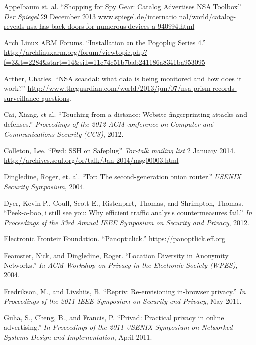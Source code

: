 \documentclass[conference]{IEEEtran}
\begin{document}
\begin{thebibliography}{1}

 Appelbaum et. al. ``Shopping for Spy Gear: Catalog Advertises 
NSA Toolbox'' \emph{Der Spiegel} 29 December 2013 \url{www.spiegel.de/internatio
nal/world/catalog-reveals-nsa-has-back-doors-for-numerous-devices-a-940994.html}

 Arch Linux ARM Forums. ``Installation on the Pogoplug Series 4.'' \url{http://archlinuxarm.org/forum/viewtopic.php?f=3&t=2284&start=14&sid=11c74c51b7bab241186a8341ba953095}

 Arther, Charles.  ``NSA scandal: what data is being monitored and how does it work?'' \url{http://www.theguardian.com/world/2013/jun/07/nsa-prism-records-surveillance-questions}.

 Cai, Xiang, et al. ``Touching from a distance: Website fingerprinting attacks and defenses.'' \emph{Proceedings of the 2012 ACM conference on Computer and Communications Security (CCS)}, 2012.

 Colleton, Lee. ``Fwd: SSH on Safeplug'' \emph{Tor-talk mailing list} 2 January 2014. \url{http://archives.seul.org/or/talk/Jan-2014/msg00003.html}

 Dingledine, Roger, et. al. ``Tor: The second-generation onion router.'' \emph{USENIX Security Symposium}, 2004.

 Dyer, Kevin P., Coull, Scott E., Ristenpart, Thomas, and Shrimpton, Thomas.  ``Peek-a-boo, i still see you: Why efficient traffic analysis countermeasures fail.'' \emph{In Proceedings of the 33rd Annual IEEE Symposium on Security and Privacy}, 2012.

 Electronic Fronteir Foundation. ``Panopticlick.'' \url{https://panoptlick.eff.org}

 Feamster, Nick, and Dingledine, Roger.  ``Location Diversity in Anonymity Networks.''  \emph{In ACM Workshop on Privacy in the Electronic Society (WPES)}, 2004.

 Fredrikson, M., and Livshits, B. ``Repriv: Re-envisioning in-browser privacy.'' \emph{In Proceedings of the 2011 IEEE Symposium on Security and Privacy}, May 2011.

 Guha, S., Cheng, B., and Francis, P. ``Privad: Practical privacy in online advertising.'' \emph{In Proceedings of the 2011 USENIX Symposium on Networked Systems Design and Implementation}, April 2011.


\end{thebibliography}
\end{document}
